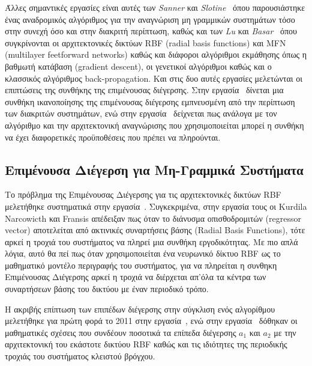 Άλλες σημαντικές εργασίες είναι αυτές των \textit{Sanner} και \textit{Slotine}~\cite{sanner1992stable} όπου παρουσιάστηκε ένας αναδρομικός αλγόριθμος για την αναγνώριση μη γραμμικών συστημάτων τόσο στην συνεχή όσο και στην διακριτή περίπτωση, καθώς και των \textit{Lu} και \textit{Basar}~\cite{lu1998robust} όπου συγκρίνονται οι αρχιτεκτονικές δικτύων RBF (radial basis functions) και MFN (multilayer feetforward networks) καθώς και διάφοροι αλγόριθμοι εκμάθησης όπως η βαθμωτή κατάβαση (gradient descent), οι γενετικοί αλγόριθμοι καθώς και ο κλασσικός αλγόριθμος back-propagation. Και στις δυο αυτές εργασίες μελετώνται οι επιπτώσεις της συνθήκης της επιμένουσας διέγερσης. Στην εργασία~\cite{sanner1992stable} δίνεται μια συνθήκη ικανοποίησης της επιμένουσας διέγερσης εμπνευσμένη από την περίπτωση των διακριτών συστημάτων, ενώ στην εργασία~\cite{lu1998robust} δείχνεται πως ανάλογα με τον αλγόριθμο και την αρχιτεκτονική αναγνώρισης που χρησιμοποιείται μπορεί η συνθήκη να έχει διαφορετικές προϋποθέσεις που πρέπει να πληρούνται.

\subsection{Επιμένουσα Διέγερση για Μη-Γραμμικά Συστήματα}
Το πρόβλημα της Επιμένουσας Διέγερσης για τις αρχιτεκτονικές δικτύων RBF μελετήθηκε συστηματικά στην εργασία~\cite{kurdila1995persistency}. Συγκεκριμένα, στην εργασία τους οι Kurdila Narcowicth και Fransis απέδειξαν πως όταν το διάνυσμα οπισθοδρομιτών (regressor vector) αποτελείται από ακτινικές συναρτήσεις βάσης (Radial Basis Functions), τότε αρκεί η τροχιά του συστήματος να πληρεί μια συνθήκη εργοδικότητας. Με πιο απλά λόγια, αυτό θα πεί πως όταν χρησιμοποιείται ένα νευρωνικό δίκτυο RBF ως το μαθηματικό μοντέλο περιγραφής του συστήματος, για να πληρείται η συνθηκη Επιμένουσας Διέγερσης αρκεί η τροχιά να διέρχεται απ'όλα τα κέντρα των συναρτήσεων βάσης του δικτύου με έναν περιοδικό τρόπο.

Η ακριβής επίπτωση των επιπέδων διέγερσης στην σύγκλιση ενός αλγορίθμου μελετήθηκε για πρώτη φορά το 2011 στην εργασία~\cite{yuan2011persistency}, ενώ στην εργασία~\cite{zheng2017relationship} δόθηκαν οι μαθηματικές σχέσεις που συνδέουν ποσοτικά τα επίπεδα διέγερσης $a_1$ και $a_2$ με την αρχιτεκτονική του εκάστοτε δικτύου RBF καθώς και τις ιδιότητες της περιοδικής τροχιάς του συστήματος κλειστού βρόγχου.

